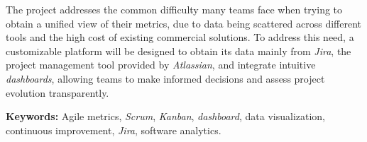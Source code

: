 The project addresses the common difficulty many teams face when trying to obtain a unified view of their metrics, due to data being scattered across different tools and the high cost of existing commercial solutions. To address this need, a customizable platform will be designed to obtain its data mainly from \textit{Jira}, the project management tool provided by \textit{Atlassian}, and integrate intuitive \textit{dashboards}, allowing teams to make informed decisions and assess project evolution transparently.

\noindent\textbf{Keywords:} 
Agile metrics, \textit{Scrum}, \textit{Kanban}, \textit{dashboard}, data visualization, continuous improvement, \textit{Jira}, software analytics.


\vfill